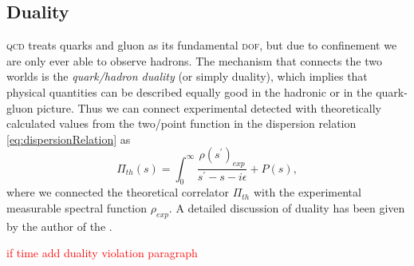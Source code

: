 \documentclass[../../index.tex]{subfiles}
\begin{document}
\subsection{Duality}
\textsc{qcd} treats quarks and gluon as its fundamental \textsc{dof}, but due to
confinement we are only ever able to observe hadrons. The mechanism that
connects the two worlds is the \textit{quark\-/hadron duality} (or simply
duality), which implies that physical quantities can be described equally good
in the hadronic or in the quark-gluon picture. Thus we can connect experimental
detected with theoretically calculated values from the two\-/point function in
the dispersion relation \cref{eq:dispersionRelation} as
\begin{equation}
  \Pi_{th}(s) = \int_0^\infty \frac{\rho(s^\prime)_{exp}}{s^\prime-s-i\epsilon} + P(s),
\end{equation}
where we connected the theoretical correlator $\Pi_{th}$ with the experimental
measurable spectral function $\rho_{exp}$. A detailed discussion of duality has
been given by the author of the \cite{Shifman2000}.

\textcolor{red}{if time add duality violation paragraph}
\end{document}
